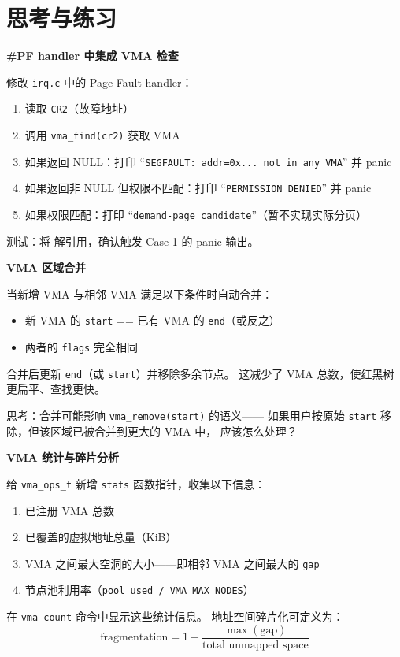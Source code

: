 \section{思考与练习}

\begin{exercise}
\textbf{\#PF handler 中集成 VMA 检查}

修改 \texttt{irq.c} 中的 Page Fault handler：
\begin{enumerate}
  \item 读取 \texttt{CR2}（故障地址）
  \item 调用 \texttt{vma\_find(cr2)} 获取 VMA
  \item 如果返回 NULL：打印 ``\texttt{SEGFAULT: addr=0x... not in any VMA}'' 并 panic
  \item 如果返回非 NULL 但权限不匹配：打印 ``\texttt{PERMISSION DENIED}'' 并 panic
  \item 如果权限匹配：打印 ``\texttt{demand-page candidate}''（暂不实现实际分页）
\end{enumerate}
测试：将  解引用，确认触发 Case 1 的 panic 输出。
\end{exercise}

\begin{exercise}
\textbf{VMA 区域合并}

当新增 VMA 与相邻 VMA 满足以下条件时自动合并：
\begin{itemize}
  \item 新 VMA 的 \texttt{start} == 已有 VMA 的 \texttt{end}（或反之）
  \item 两者的 \texttt{flags} 完全相同
\end{itemize}
合并后更新 \texttt{end}（或 \texttt{start}）并移除多余节点。
这减少了 VMA 总数，使红黑树更扁平、查找更快。

思考：合并可能影响 \texttt{vma\_remove(start)} 的语义——
如果用户按原始 \texttt{start} 移除，但该区域已被合并到更大的 VMA 中，
应该怎么处理？
\end{exercise}

\begin{exercise}
\textbf{VMA 统计与碎片分析}

给 \texttt{vma\_ops\_t} 新增 \texttt{stats} 函数指针，收集以下信息：
\begin{enumerate}
  \item 已注册 VMA 总数
  \item 已覆盖的虚拟地址总量（KiB）
  \item VMA 之间最大空洞的大小——即相邻 VMA 之间最大的 \texttt{gap}
  \item 节点池利用率（\texttt{pool\_used / VMA\_MAX\_NODES}）
\end{enumerate}
在 \texttt{vma count} 命令中显示这些统计信息。
地址空间碎片化可定义为：
$$\text{fragmentation} = 1 - \frac{\max(\text{gap})}
  {\text{total unmapped space}} $$
\end{exercise}

